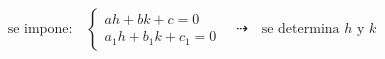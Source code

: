 \documentclass[preview]{standalone}
\begin{document}
\begin{align*}
\text{se impone:}\quad \left\{\begin{array}{l} ah+bk+c=0\\ a_1h+b_1k+c_1=0 \end{array}\right.\quad\dashrightarrow\quad\text{se determina }h\text{ y }k
\end{align*}
\end{document}
